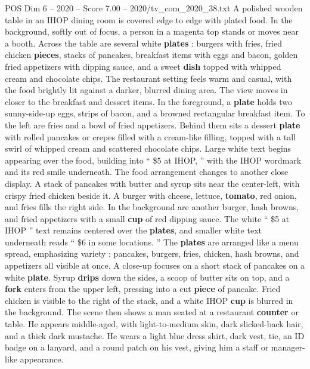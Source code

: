 \begin{textsample}{POS Dim 6 – 2020 – Score 7.00 – 2020/tv\_com\_2020\_38.txt}  \label{ex:f6_pos_068}
A polished wooden table in an IHOP dining room is covered edge to edge with plated food.
In the background, softly out of focus, a person in a magenta top stands or moves near a booth.
Across the table are several white \textbf{plates} : burgers with fries, fried chicken \textbf{pieces}, stacks of pancakes, breakfast items with eggs and bacon, golden fried appetizers with dipping sauce, and a sweet \textbf{dish} topped with whipped cream and chocolate chips.
The restaurant setting feels warm and casual, with the food brightly lit against a darker, blurred dining area.
The view moves in closer to the breakfast and dessert items.
In the foreground, a \textbf{plate} holds two sunny-side-up eggs, strips of bacon, and a browned rectangular breakfast item.
To the left are fries and a bowl of fried appetizers.
Behind them sits a dessert \textbf{plate} with rolled pancakes or crepes filled with a cream-like filling, topped with a tall swirl of whipped cream and scattered chocolate chips.
Large white text begins appearing over the food, building into “ \$5 at IHOP, ” with the IHOP wordmark and its red smile underneath.
The food arrangement changes to another close display.
A stack of pancakes with butter and syrup sits near the center-left, with crispy fried chicken beside it.
A burger with cheese, lettuce, \textbf{tomato}, red onion, and fries fills the right side.
In the background are another burger, hash browns, and fried appetizers with a small \textbf{cup} of red dipping sauce.
The white “ \$5 at IHOP ” text remains centered over the \textbf{plates}, and smaller white text underneath reads “ \$6 in some locations. ” The \textbf{plates} are arranged like a menu spread, emphasizing variety : pancakes, burgers, fries, chicken, hash browns, and appetizers all visible at once.
A close-up focuses on a short stack of pancakes on a white \textbf{plate}.
Syrup \textbf{drips} down the sides, a scoop of butter sits on top, and a \textbf{fork} enters from the upper left, pressing into a cut \textbf{piece} of pancake.
Fried chicken is visible to the right of the stack, and a white IHOP \textbf{cup} is blurred in the background.
The scene then shows a man seated at a restaurant \textbf{counter} or table.
He appears middle-aged, with light-to-medium skin, dark slicked-back hair, and a thick dark mustache.
He wears a light blue dress shirt, dark vest, tie, an ID badge on a lanyard, and a round patch on his vest, giving him a staff or manager-like appearance.

\end{textsample}
